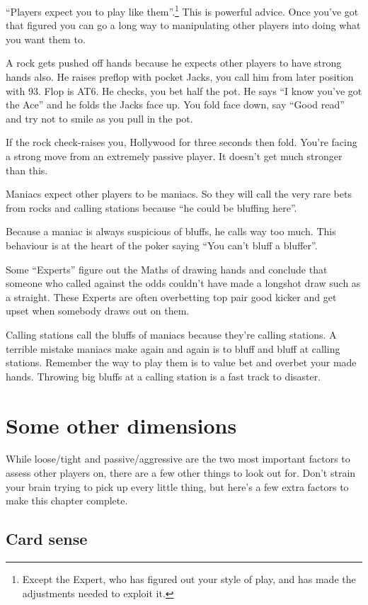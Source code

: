 ``Players expect you to play like them''.\footnote{Except the Expert, who
has figured out your style of play, and has made the adjustments
needed to exploit it.} This is powerful advice.
Once you've got that figured you
can go a long way to manipulating other players into doing what
you want them to.

A rock gets pushed off hands because he expects other players to
have strong hands also. He raises preflop with pocket Jacks,
you call him from later position with 93. Flop is AT6. He checks, you
bet half the pot. He says ``I know you've got the Ace'' and he
folds the Jacks face up. You fold face down, say ``Good read''
and try not to smile as you pull in the pot.

If the rock check-raises you, Hollywood for three seconds then fold.
You're facing a strong move from an extremely passive player. It
doesn't get much stronger than this.

Maniacs expect other players to be maniacs. So they will call the
very rare bets from rocks and calling stations because ``he could
be bluffing here''.

Because a maniac is always suspicious of bluffs, he calls way too much.
This behaviour is at the heart of the poker saying ``You can't bluff
a bluffer''.

Some ``Experts'' figure out the Maths of drawing hands and conclude
that someone who called against the odds couldn't have made a longshot
draw such as a straight. These Experts are often overbetting top pair
good kicker and get upset when somebody draws out on them.

Calling stations call the bluffs of maniacs because they're calling
stations. A terrible mistake maniacs make again and again is to bluff
and bluff at calling stations. Remember the way to play them is to
value bet and overbet your made hands. Throwing big bluffs at a
calling station is a fast track to disaster.

\section{Some other dimensions}

While loose/tight and passive/aggressive are the two most important
factors to assess other players on, there are a few other things to
look out for. Don't strain your brain trying to pick up every little
thing, but here's a few extra factors to make this chapter complete.

\subsection{Card sense}

